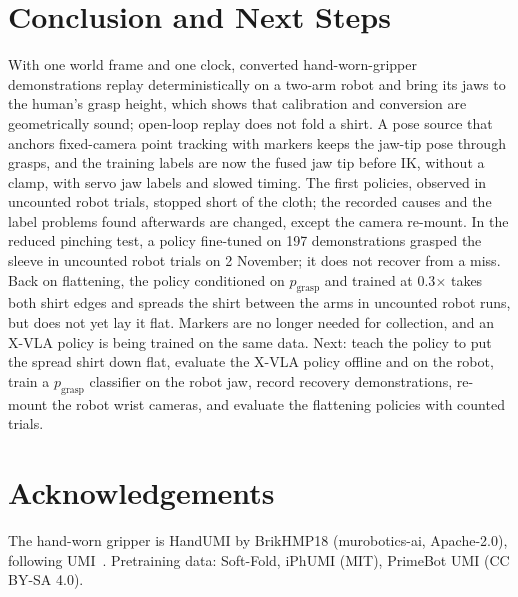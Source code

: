 \documentclass[conference,10pt]{IEEEtran}
\begin{document}
\section{Conclusion and Next Steps}\label{sec:next}
With one world frame and one clock, converted hand-worn-gripper demonstrations replay deterministically on a two-arm
robot and bring its jaws to the human's grasp height, which shows that calibration and conversion are geometrically
sound; open-loop replay does not fold a shirt. A pose source that anchors fixed-camera point tracking with markers keeps
the jaw-tip pose through grasps, and the training labels are now the fused jaw tip before IK, without a clamp, with
servo jaw labels and slowed timing. The first policies, observed in uncounted robot trials, stopped short of the cloth;
the recorded causes and the label problems found afterwards are changed, except the camera re-mount. In the reduced
pinching test, a policy fine-tuned on 197 demonstrations grasped the sleeve in uncounted robot trials on 2 November; it
does not recover from a miss. Back on flattening, the policy conditioned on $p_\mathrm{grasp}$ and trained at
0.3$\times$ takes both shirt edges and spreads the shirt between the arms in uncounted robot runs, but does not yet lay
it flat. Markers are no longer needed for collection, and an X-VLA policy is being trained on the same data. Next: teach
the policy to put the spread shirt down flat, evaluate the X-VLA policy offline and on the robot, train a
$p_\mathrm{grasp}$ classifier on the robot jaw, record recovery demonstrations, re-mount the robot wrist cameras, and
evaluate the flattening policies with counted trials.

\section*{Acknowledgements}
The hand-worn gripper is HandUMI by BrikHMP18 (murobotics-ai, Apache-2.0), following UMI~\cite{chi2024umi}. Pretraining
data: Soft-Fold, iPhUMI (MIT), PrimeBot UMI (CC BY-SA 4.0).
\end{document}
